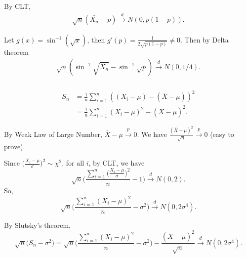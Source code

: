 \subsection{} %

\subsubsection{} %

By CLT,
\begin{align}
    \sqrt{n}(\bar{X_n} - p)\xrightarrow{d} N(0,p(1-p)).
\end{align}

Let $g(x)=\sin^{-1}(\sqrt{x})$,
then $g'(p)=\frac{1}{2\sqrt{p(1-p)}}\ne 0$.
Then by Delta theorem
\begin{align}
    \sqrt{n}(\sin^{-1}\sqrt{\bar{X_n}} - \sin^{-1}\sqrt{p})\xrightarrow{d} N(0,1/4).
\end{align}

\subsubsection{} %

\begin{align}
    S_n
        &= \frac{1}{n}\sum_{i=1}^n ((X_i-\mu) - (\bar X - \mu))^2 \\
        &= \frac{1}{n}\sum_{i=1}^n (X_i-\mu)^2 - (\bar X - \mu)^2.
\end{align}

By Weak Law of Large Number, $\bar X - \mu\xrightarrow{p} 0$.
We have $\frac{(\bar X - \mu)^2}{\sqrt{n}}\xrightarrow{p} 0$ (easy to prove).

Since $\big(\frac{X_i-\mu}{\sigma}\big)^2\sim\chi^2$, for all $i$,
by CLT, we have
\begin{equation}
    \sqrt{n}\bigg(\frac{\sum_{i=1}^n \big(\frac{X_i-\mu}{\sigma}\big)^2}{n} - 1\bigg) \xrightarrow{d} N(0,2).
\end{equation}
So,
\begin{equation}
    \sqrt{n}\bigg(\frac{\sum_{i=1}^n (X_i-\mu)^2}{n} - \sigma^2\bigg) \xrightarrow{d} N(0,2\sigma^4).
\end{equation}

By Slutsky’s theorem,
\begin{equation}
    \sqrt{n}\big(S_n-\sigma^2\big) = \sqrt{n}\bigg(\frac{\sum_{i=1}^n (X_i-\mu)^2}{n} - \sigma^2\bigg) - \frac{(\bar X - \mu)^2}{\sqrt{n}}\xrightarrow{d} N(0,2\sigma^4).
\end{equation}

